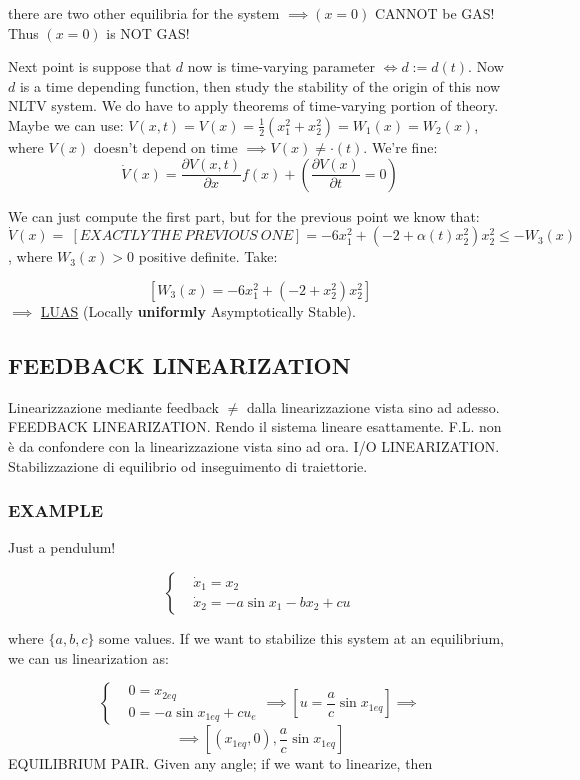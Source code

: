 there are two other equilibria for the system $\implies (x=0)$ CANNOT be GAS! Thus $(x=0)$ is NOT GAS!

Next point is suppose that $d$ now is time-varying parameter $\iff d:=d(t)$. Now $d$ is a time depending function, then study the stability of the origin of this now NLTV system. We do have to apply theorems of time-varying portion of theory. Maybe we can use: $V(x,t) = V(x) = \frac{1}{2}(x_1^2 + x_2^2) = W_1(x) = W_2(x)$, where $V(x)$ doesn't depend on time $\implies V(x) \neq \mathord{\cdot}(t)$. We're fine:
\[
	\dot{V}(x) = \frac{\partial{V(x,t)}}{\partial{x}}f(x) + (\frac{\partial{V(x)}}{\partial{t}} = 0)
\]

We can just compute the first part, but for the previous point we know that: $\dot{V}(x) =\ [EXACTLY\ THE\ PREVIOUS\ ONE] = -6x_1^2 + (-2+\alpha (t)x_2^2)x_2^2 \leq -W_3(x)$, where $W_3(x) > 0$ positive definite. Take:
	
\[
	[W_3(x) = -6x_1^2 + (-2+x_2^2)x_2^2]
\]
$\implies$ \underline{LUAS} (Locally \textbf{uniformly} Asymptotically Stable).

\subsection{FEEDBACK LINEARIZATION}

Linearizzazione mediante feedback $\neq$ dalla linearizzazione vista sino ad adesso. FEEDBACK LINEARIZATION. Rendo il sistema lineare esattamente. F.L. non è da confondere con la linearizzazione vista sino ad ora. I/O LINEARIZATION. Stabilizzazione di equilibrio od inseguimento di traiettorie.

\subsubsection{EXAMPLE}{Just a pendulum!}

\[
	\left\{
	\begin{aligned}
	&\dot{x}_1 = x_2 \\
	&\dot{x}_2 = -a\sin{x_1} - bx_2 + cu
	\end{aligned} 
	\right.
\]

where $\{a,b,c\}$ some values. If we want to stabilize this system at an equilibrium, we can us linearization as:

\[
	\left\{
	\begin{aligned}
	&0 = x_{2eq} \\
	&0 = -a\sin{x_{1eq}} + cu_e
	\end{aligned} 
	\right. \implies [u=\frac{a}{c}\sin{x_{1eq}}] \implies
\]
\[
	\implies [(x_{1eq},0), \frac{a}{c}\sin{x_{1eq}}]
\]
EQUILIBRIUM PAIR. Given any angle; if we want to linearize, then

